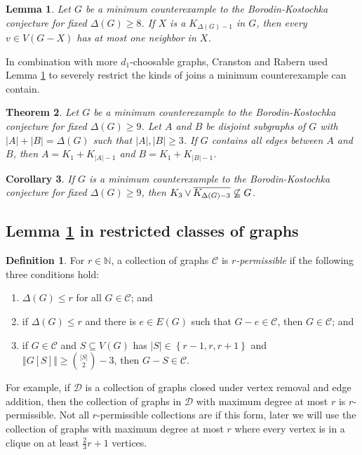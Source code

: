 \documentclass[12pt]{article}
\theoremstyle{plain}
\newtheorem{thm}{Theorem}
\newtheorem{lem}[thm]{Lemma}
\newtheorem{cor}[thm]{Corollary}
\theoremstyle{definition}
\newtheorem{defn}{Definition}
\theoremstyle{remark}
\newcommand{\fancy}[1]{\mathcal{#1}}
\newcommand{\C}[1]{\fancy{C}_{#1}}
\newcommand{\IN}{\mathbb{N}}
\newcommand{\D}{\fancy{D}}
\newcommand{\set}[1]{\left\{ #1 \right\}}
\newcommand{\card}[1]{\left|#1\right|}
\newcommand{\size}[1]{\left\Vert#1\right\Vert}
\newcommand{\join}[2]{#1 \mbox{\hspace{2 pt}$\vee$\hspace{2 pt}} #2}
\def\D{\fancy{D}}
\def\C{\fancy{C}}
\begin{document}
\begin{lem}\label{EdgesIntoDeltaMinusOneClique}
Let $G$ be a minimum counterexample to the Borodin-Kostochka conjecture for fixed $\Delta(G) \ge 8$. 
If $X$ is a $K_{\Delta(G) - 1}$ in $G$, then every $v \in V(G-X)$ has at most one neighbor in $X$.
\end{lem}

In combination with more $d_1$-choosable graphs, Cranston and Rabern \cite{cranstonrabernapriori} used Lemma \ref{EdgesIntoDeltaMinusOneClique} to severely restrict the kinds of joins
a minimum counterexample can contain.

\begin{thm}
Let $G$ be a minimum counterexample to the Borodin-Kostochka conjecture for fixed $\Delta(G) \ge 9$.  Let $A$ and $B$ be disjoint subgraphs of $G$ with $\card{A} + \card{B} = \Delta(G)$ 
such that $\card{A},\card{B} \ge 3$.  If $G$ contains all edges between $A$ and $B$, then $A = K_1 + K_{\card{A} - 1}$ and $B = K_1 + K_{\card{B} - 1}$.
\end{thm}

\begin{cor}
If $G$ is a minimum counterexample to the Borodin-Kostochka conjecture for fixed $\Delta(G) \ge 9$, then $\join{K_3}{\overline{K_{\Delta(G)-3}}} \not \subseteq G$.
\end{cor}

\subsection{Lemma \ref{EdgesIntoDeltaMinusOneClique} in restricted classes of graphs}
\begin{defn}
For $r \in \IN$, a collection of graphs $\C$ is \emph{$r$-permissible} if the following three conditions hold:
\begin{enumerate}
\item $\Delta(G) \le r$ for all $G \in \C$; and
\item if $\Delta(G) \le r$ and there is $e \in E(G)$ such that $G-e \in \C$, then $G \in \C$; and
\item if $G \in \C$ and $S \subseteq V(G)$ has $\card{S} \in \set{r-1,r,r+1}$ and $\size{G[S]} \ge \binom{|S|}{2} - 3$, then $G-S \in \C$.
\end{enumerate}
\end{defn}

For example, if $\D$ is a collection of graphs closed under vertex removal and edge addition, then the collection of graphs in $\D$ with maximum degree at most $r$ is $r$-permissible.
Not all $r$-permissible collections are if this form, later we will use the collection of graphs with maximum degree at most $r$ where every vertex is in a clique on at least $\frac23 r + 1$ vertices.
\end{document}
